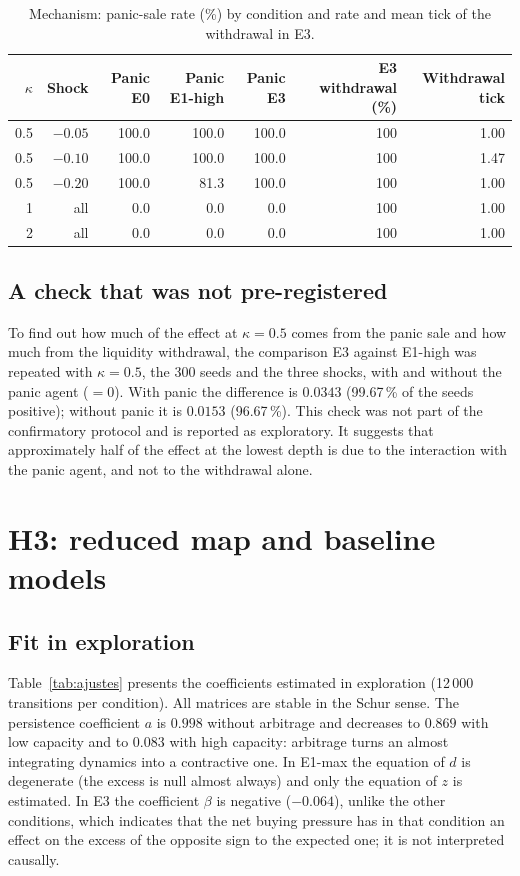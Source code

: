 \begin{table}[htbp]
\centering
\caption{Mechanism: panic-sale rate (\%) by condition and rate and mean tick of the withdrawal in E3.}
\label{tab:mecanismo}
\small
\begin{tabular}{@{}rrrrrrr@{}}
\toprule
$\kappa$ & Shock & Panic E0 & Panic E1-high & Panic E3 & E3 withdrawal (\%) & Withdrawal tick \\
\midrule
0.5 & $-0.05$ & 100.0 & 100.0 & 100.0 & 100 & 1.00 \\
0.5 & $-0.10$ & 100.0 & 100.0 & 100.0 & 100 & 1.47 \\
0.5 & $-0.20$ & 100.0 & 81.3 & 100.0 & 100 & 1.00 \\
1 & all & 0.0 & 0.0 & 0.0 & 100 & 1.00 \\
2 & all & 0.0 & 0.0 & 0.0 & 100 & 1.00 \\
\bottomrule
\end{tabular}
\end{table}

\subsection{A check that was not pre-registered}

To find out how much of the effect at $\kappa=0.5$ comes from the panic sale and how much from the liquidity withdrawal, the comparison E3 against E1-high was repeated with $\kappa=0.5$, the 300 seeds and the three shocks, with and without the panic agent ($=0$). With panic the difference is $0.0343$ (99.67\,\% of the seeds positive); without panic it is $0.0153$ (96.67\,\%). This check was not part of the confirmatory protocol and is reported as exploratory. It suggests that approximately half of the effect at the lowest depth is due to the interaction with the panic agent, and not to the withdrawal alone.

\section{H3: reduced map and baseline models}
\label{sec:res-h3}

\subsection{Fit in exploration}

Table~\ref{tab:ajustes} presents the coefficients estimated in exploration (12\,000 transitions per condition). All matrices are stable in the Schur sense. The persistence coefficient $a$ is $0.998$ without arbitrage and decreases to $0.869$ with low capacity and to $0.083$ with high capacity: arbitrage turns an almost integrating dynamics into a contractive one. In E1-max the equation of $d$ is degenerate (the excess is null almost always) and only the equation of $z$ is estimated. In E3 the coefficient $\beta$ is negative ($-0.064$), unlike the other conditions, which indicates that the net buying pressure has in that condition an effect on the excess of the opposite sign to the expected one; it is not interpreted causally.

